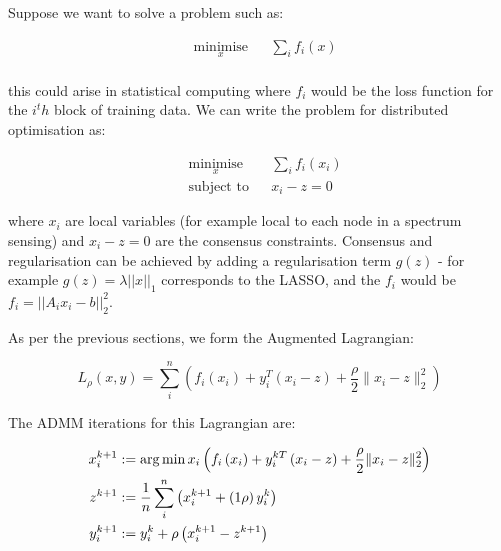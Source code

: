 \begin{example}[Consensus]

Suppose we want to solve a problem such as:

\begin{equation*}
\begin{aligned}
& \underset{x}{\text{minimise}}
& & \sum_i f_i\left( x \right) \\
\label{consensus}
\end{aligned}
\end{equation*}

this could arise in statistical computing where \(f_i\) would be the loss function for the \(i^th\) block of training data. We can write the problem for distributed optimisation as:

\begin{equation*}
\begin{aligned}
& \underset{x}{\text{minimise}}
& & \sum_i f_i\left( x_i \right) \\
& \text{subject to}
& & x_i - z = 0
\label{admm_consensus}
\end{aligned}
\end{equation*}

where \(x_i\) are local variables (for example local to each node in a spectrum sensing) and \(x_i - z = 0\) are the consensus constraints. Consensus and regularisation can be achieved by adding a regularisation term \(g\left(z\right)\) - for example \(g\left(z\right) = \lambda||x||_1\) corresponds to the LASSO, and the \(f_i\) would be \(f_i = ||A_ix_i - b||_2^2\). 

As per the previous sections, we form the Augmented Lagrangian:

\begin{equation}
L_\rho\left(x,y\right) = \sum_i^n \left(f_i\left( x_i \right) + y_i^T\left(x_i-z\right) + \frac{\rho}{2}\|x_i-z\|_2^2\right)
\end{equation}

The ADMM iterations for this Lagrangian are:

\begin{align}
x_i^{k+1} &:= \operatorname*{arg\,min}{x_i} \left(f_i\left( x_i \right) + y_i^{kT}\left(x_i-z\right) + \frac{\rho}{2}\|x_i-z\|_2^2\right)\\
z^{k+1} &:= \frac{1}{n}\sum_i^n \left(x_i^{k+1} + \left(1\rho\right)y_i^k\right)\\
y_i^{k+1} &:= y_i^{k} + \rho \left(x_i^{k+1} - z^{k+1} \right)
\label{consensus_iterations}
\end{align}


\end{example}

